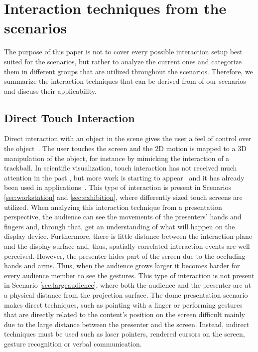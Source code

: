 \documentclass[journal]{vgtc}                %
\begin{document}
\section{Interaction techniques from the scenarios} \label{sec:techniques}
The purpose of this paper is not to cover every possible interaction setup best suited for the scenarios, but rather to analyze the current ones and categorize them in different groups that are utilized throughout the scenarios.
Therefore, we summarize the interaction techniques that can be derived from of our scenarios and discuss their applicability.

\subsection{Direct Touch Interaction}
Direct interaction with an object in the scene gives the user a feel of control over the object~\cite{isenberg2009studying}. 
The user touches the screen and the 2D motion is mapped to a 3D manipulation of the object, for instance by mimicking the interaction of a trackball.
In scientific visualization, touch interaction has not received much attention in the past \cite{isenberg:hal-00781512}, but more work is starting to appear~\cite{Klein:2012:DSD:2322389.2322403} and it has already been used in applications~\cite{LRFPY11}.
This type of interaction is present in Scenarios \ref{sec:workstation} and \ref{sec:exhibition}, where differently sized touch screens are utilized. 
When analyzing this interaction technique from a presentation perspective, the audience can see the movements of the presenters' hands and fingers and, through that, get an understanding of what will happen on the display device.
Furthermore, there is little distance between the interaction plane and the display surface and, thus, spatially correlated interaction events are well perceived.
However, the presenter hides part of the screen due to the occluding hands and arms.
Thus, when the audience grows larger it becomes harder for every audience member to see the gestures.
This type of interaction is not present in Scenario \ref{sec:largeaudience}, where both the audience and the presenter are at a physical distance from the projection surface.
The dome presentation scenario makes direct techniques, such as pointing with a finger or performing gestures that are directly related to the content's position on the screen difficult mainly due to the large distance between the presenter and the screen.
Instead, indirect techniques must be used such as laser pointers, rendered cursors on the screen, gesture recognition or verbal communication.
\end{document}
